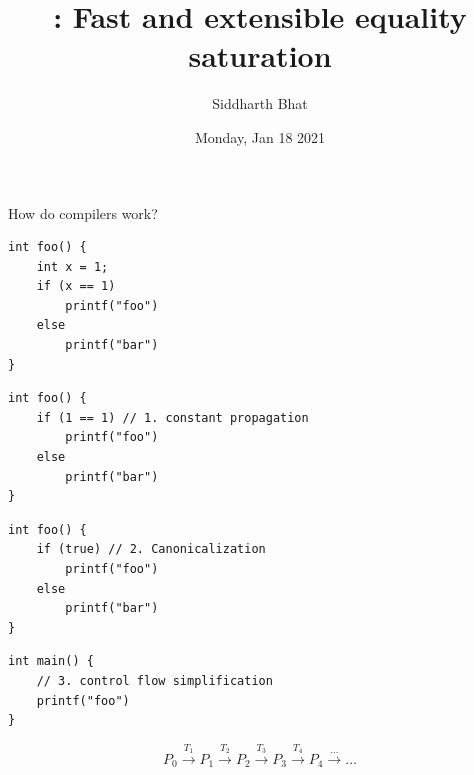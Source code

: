 \documentclass[8pt]{beamer}
\author{Siddharth Bhat}
\date{Monday, Jan 18 2021}
\title{\egg: Fast and extensible equality saturation}
\begin{document}


\maketitle

\begin{frame}[fragile]{How do compilers work?}
\begin{verbatim}
int foo() {
    int x = 1;
    if (x == 1)
        printf("foo")
    else
        printf("bar")
}
\end{verbatim}

\pause

\begin{verbatim}
int foo() {
    if (1 == 1) // 1. constant propagation
        printf("foo")
    else
        printf("bar")
}
\end{verbatim}

\pause

\begin{verbatim}
int foo() {
    if (true) // 2. Canonicalization
        printf("foo")
    else
        printf("bar")
}
\end{verbatim}

\pause

\begin{verbatim}
int main() {
    // 3. control flow simplification
    printf("foo")
}
\end{verbatim}

\pause
$$
P_0
\xrightarrow{T_1}         P_1
\xrightarrow{T_2}         P_2
\xrightarrow{T_3}         P_3
\xrightarrow{T_4}         P_4
\xrightarrow{\dots}
\dots
$$
\end{frame}
\end{document}
